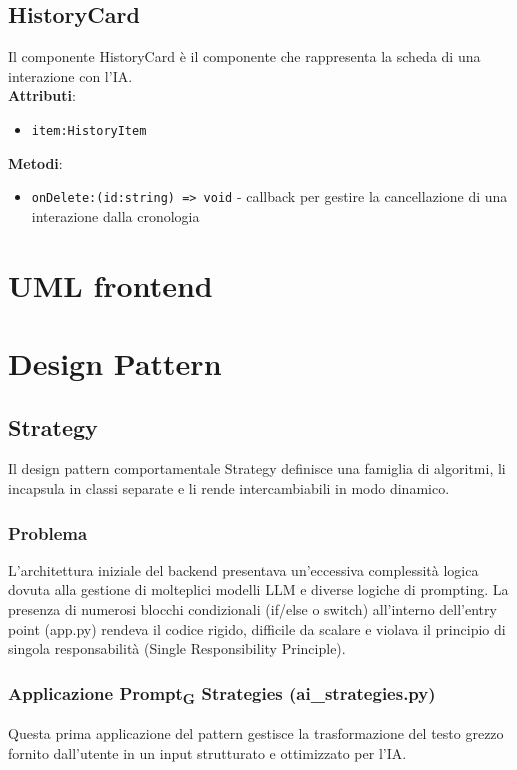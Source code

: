 \documentclass[11pt,a4paper]{article}
\newcommand{\gls}[1]{#1\textsubscript{G}}
\begin{document}
\subsection{HistoryCard}
Il componente HistoryCard è il componente che rappresenta la scheda di una interazione con l'IA.\\

\textbf{Attributi}:
\begin{itemize}
    \item \texttt{item:HistoryItem}
\end{itemize}

\textbf{Metodi}:
\begin{itemize}
    \item \texttt{onDelete:(id:string) => void} - callback per gestire la cancellazione di una interazione dalla cronologia
\end{itemize}

\section{UML frontend}

\section{Design Pattern}
\subsection{Strategy}
Il design pattern comportamentale Strategy definisce una famiglia di algoritmi, li incapsula in classi separate e li rende intercambiabili in modo dinamico.
\subsubsection{Problema}
L’architettura iniziale del backend presentava un'eccessiva complessità logica dovuta alla gestione di molteplici modelli LLM e diverse logiche di prompting. La presenza di numerosi blocchi condizionali (if/else o switch) all'interno dell'entry point (app.py) rendeva il codice rigido, difficile da scalare e violava il principio di singola responsabilità (Single Responsibility Principle).
\subsubsection{Applicazione \gls{Prompt} Strategies (ai\_strategies.py)}
Questa prima applicazione del pattern gestisce la trasformazione del testo grezzo fornito dall'utente in un input strutturato e ottimizzato per l'IA.
\end{document}
